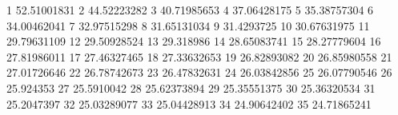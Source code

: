 1	52.51001831
2	44.52223282
3	40.71985653
4	37.06428175
5	35.38757304
6	34.00462041
7	32.97515298
8	31.65131034
9	31.4293725
10	30.67631975
11	29.79631109
12	29.50928524
13	29.318986
14	28.65083741
15	28.27779604
16	27.81986011
17	27.46327465
18	27.33632653
19	26.82893082
20	26.85980558
21	27.01726646
22	26.78742673
23	26.47832631
24	26.03842856
25	26.07790546
26	25.924353
27	25.5910042
28	25.62373894
29	25.35551375
30	25.36320534
31	25.2047397
32	25.03289077
33	25.04428913
34	24.90642402
35	24.71865241
